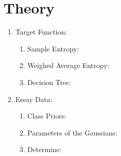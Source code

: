 \documentclass[12pt]{article}
\begin{document}
	
	\maketitle
	
	\section{Theory}
	
	\begin{enumerate}
		\item Target Function:
		
		
		\begin{enumerate}
			
			\item Sample Entropy:\\
			
			
			
			\item Weighed Average Entropy:\\
			
			
			
			\item Decision Tree:\\
			
			
			
		\end{enumerate}
		
		\begin{comment}
		\newpage
		\end{comment}
		
		
		\item Essay Data:\\
		
		\begin{enumerate}
			
			\item Class Priors:\\
			
			
			
			\item Parameters of the Gaussians:\\
			
			
			
			\item Determine:\\
			
			
		\end{enumerate}
		
		
	\end{enumerate}
	
	\newpage
	
\end{document}
